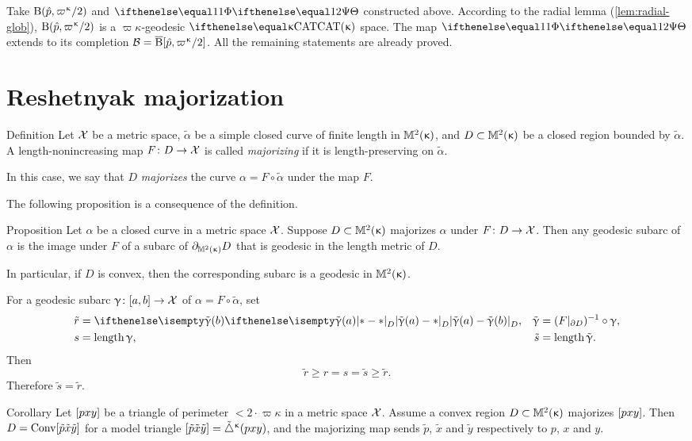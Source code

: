 Take $\oBall(\hat p,\varpi\kappa/2)$ and $\map$ constructed above.
According to the radial lemma (\ref{lem:radial-glob}), $\oBall(\hat p,\varpi\kappa/2)$ is a $\varpi\kappa$-geodesic $\CAT\kappa$ space.
The map $\map$ extends to its completion $\spc{B}\z=\cBall[\hat p,\varpi\kappa/2]$. 
All the remaining statements are already proved.
\qeds

\section{Reshetnyak majorization}\label{sec:resh-kirz}

\begin{thm}{Definition}\label{def:majorize}
Let $\mathcal{X}$ be a metric space,
$\tilde \alpha$ be a simple closed curve of finite length  in $\mathbb{M}_{{}}^{2}({\upkappa})$,
and $D\subset\Lob2{\kappa}$ be a closed region bounded by $\tilde \alpha$.
A length-nonincreasing map $F\:D\to\spc{X}$ is called \emph{majorizing} if it is length-preserving on $\tilde \alpha$.

In this case, we say that $D$ \emph{majorizes} the curve $\alpha=F\circ\tilde \alpha$ under the map $F$.
\end{thm}

The following proposition is a consequence of the definition.

\begin{thm}{Proposition}
\label{prop:majorize-geodesic} 
Let  $\alpha$  be a closed curve in a metric space $\mathcal{X}$.
Suppose $D\subset\Lob2{\kappa}$ majorizes $\alpha$ under $F\: D \to \spc{X}$.  
Then any geodesic subarc of $\alpha$ is the image under $F$ of a subarc of $\partial_{\mathbb{M}_{{}}^{2}({\upkappa})} D$ that is geodesic in the length metric of $D$.

In particular, if $D$ is convex, then the corresponding subarc is a geodesic in $\mathbb{M}_{{}}^{2}({\upkappa})$.
\end{thm}

 For a geodesic subarc $\gamma\:[a,b]\to\spc{X}$ of $\alpha=F\circ\tilde \alpha$, set
\begin{align*}
\tilde r&=\dist{\tilde \gamma(a)}{\tilde \gamma(b)}{D},
&
\tilde \gamma &= (F|_{\Fr D})^{-1}\circ\gamma,
\\
s&=\length \gamma,
&
\tilde s&= \length \tilde \gamma.
\end{align*}
Then
\[\tilde r\ge r = s =\tilde s\ge\tilde r.\]
Therefore $\tilde s=\tilde r$.
\qeds

\begin{thm}{Corollary}\label{cor:maj-triangle}
Let $[{p}{x}{y}]$ be a triangle of perimeter $<2\cdot\varpi\kappa$ in a metric space $\mathcal{X}$. Assume a convex region $D\subset \Lob2\kappa$ majorizes $[{p}{x}{y}]$.
Then $D=\mathop{\rm Conv}\nolimits[{\tilde p}{\tilde x}{\tilde y}]$ for a model triangle $[{\tilde p}{\tilde x}{\tilde y}]={\tilde\triangle}^{\upkappa}(p x y)$, and the majorizing map sends  $\tilde p$, $\tilde x$ and $\tilde y$ respectively to $p$, $x$ and $y$.
\end{thm}

